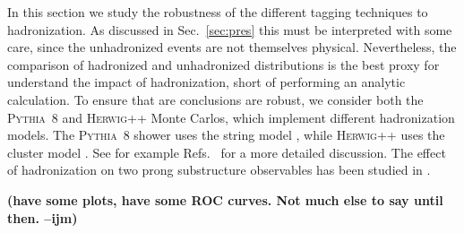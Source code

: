 \documentclass[11pt,letterpaper]{article}
\newcommand{\pythia}{\textsc{Pythia~8}\xspace}
\newcommand{\herwig}{\textsc{Herwig++}\xspace}
\DeclareRobustCommand{\Sec}[1]{Sec.~\ref{#1}}
\DeclareRobustCommand{\Refs}[1]{Refs.~\cite{#1}}
\newcommand{\ijm}[1]{\textbf{\textcolor{llblue}{(#1 --ijm)}}}
\begin{document}
\begin{figure}
\begin{center}
\qquad
{}
\end{center}
\caption{ 
}
\label{fig:UE}
\end{figure}

In this section we study the robustness of the different tagging techniques to hadronization. As discussed in \Sec{sec:pres} this must be interpreted with some care, since the unhadronized events are not themselves physical. Nevertheless, the comparison of hadronized and unhadronized distributions is the best proxy for understand the impact of hadronization, short of performing an analytic calculation. To ensure that are conclusions are robust, we consider both the \pythia and \herwig Monte Carlos, which implement different hadronization models. The \pythia shower uses the string model \cite{Andersson:1983ia,Andersson:1998tv}, while \herwig uses the cluster model \cite{Webber:1983if,Marchesini:1987cf}. See for example \Refs{Buckley:2011ms,Skands:2011pf,Skands:2012ts} for a more detailed discussion. The effect of hadronization on two prong substructure observables has been studied in \cite{Larkoski:2015kga,Salam:2016yht}.


\ijm{have some plots, have some ROC curves. Not much else to say until then.}
\end{document}
